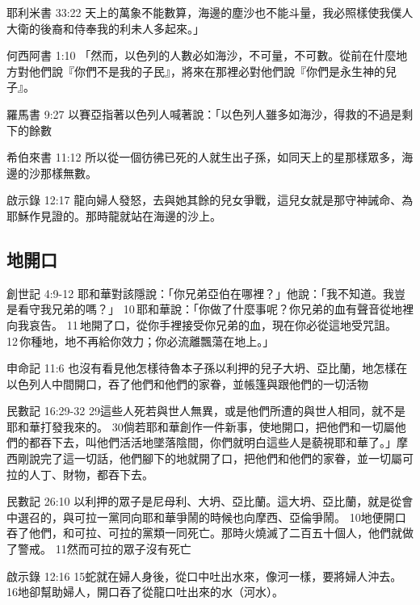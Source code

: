耶利米書 33:22
天上的萬象不能數算，海邊的塵沙也不能斗量，我必照樣使我僕人大衛的後裔和侍奉我的利未人多起來。」

何西阿書 1:10
「然而，以色列的人數必如海沙，不可量，不可數。從前在什麼地方對他們說『你們不是我的子民』，將來在那裡必對他們說『你們是永生神的兒子』。


羅馬書 9:27
以賽亞指著以色列人喊著說：「以色列人雖多如海沙，得救的不過是剩下的餘數

希伯來書 11:12
所以從一個彷彿已死的人就生出子孫，如同天上的星那樣眾多，海邊的沙那樣無數。

啟示錄 12:17
龍向婦人發怒，去與她其餘的兒女爭戰，這兒女就是那守神誡命、為耶穌作見證的。那時龍就站在海邊的沙上。




\subsection{地開口}
創世記 4:9-12
耶和華對該隱說：「你兄弟亞伯在哪裡？」他說：「我不知道。我豈是看守我兄弟的嗎？」 10 耶和華說：「你做了什麼事呢？你兄弟的血有聲音從地裡向我哀告。 11 地開了口，從你手裡接受你兄弟的血，現在你必從這地受咒詛。 12 你種地，地不再給你效力；你必流離飄蕩在地上。」

申命記 11:6
也沒有看見他怎樣待魯本子孫以利押的兒子大坍、亞比蘭，地怎樣在以色列人中間開口，吞了他們和他們的家眷，並帳篷與跟他們的一切活物

民數記 16:29-32
29這些人死若與世人無異，或是他們所遭的與世人相同，就不是耶和華打發我來的。 30倘若耶和華創作一件新事，使地開口，把他們和一切屬他們的都吞下去，叫他們活活地墜落陰間，你們就明白這些人是藐視耶和華了。」摩西剛說完了這一切話，他們腳下的地就開了口，把他們和他們的家眷，並一切屬可拉的人丁、財物，都吞下去。

民數記 26:10
以利押的眾子是尼母利、大坍、亞比蘭。這大坍、亞比蘭，就是從會中選召的，與可拉一黨同向耶和華爭鬧的時候也向摩西、亞倫爭鬧。 10地便開口吞了他們，和可拉、可拉的黨類一同死亡。那時火燒滅了二百五十個人，他們就做了警戒。 11然而可拉的眾子沒有死亡

啟示錄 12:16
15蛇就在婦人身後，從口中吐出水來，像河一樣，要將婦人沖去。 16地卻幫助婦人，開口吞了從龍口吐出來的水（河水）。
  
  
  
  
  
  
  
  
  
  
  
  
  
  
  
  
  
  
